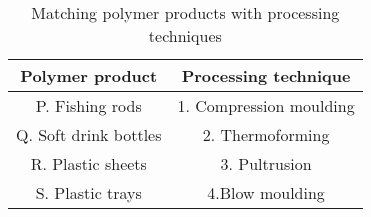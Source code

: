 \begin{table}[htbp]
\centering
\caption{Matching polymer products with processing techniques}
\label{tab:tables/table4.tex}
\begin{tabular}{c|c}
\textbf{Polymer product} & \textbf{Processing technique} \\ \hline
P. Fishing rods & 1. Compression moulding \\
Q. Soft drink bottles & 2. Thermoforming \\
R. Plastic sheets & 3. Pultrusion \\
S. Plastic trays & 4.Blow moulding \\
\end{tabular}
\end{table}